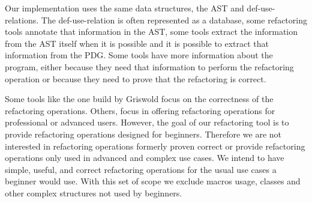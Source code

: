 
Our implementation uses the same data structures, the AST and
def-use-relations. The def-use-relation is often represented as a database,
some refactoring tools annotate that information in the AST, %
some tools extract the information from the AST itself when it is possible and
it is possible to extract that information from the PDG.
Some tools have more information about the program, either because they need that
information to perform the refactoring operation or because they need to prove that
the refactoring is correct.  %

Some tools like the one build by Griswold focus on the correctness of the refactoring
operations.
Others, focus in offering refactoring operations for professional or advanced users.
However, the goal of our refactoring tool is to provide refactoring operations
designed for beginners. %
Therefore we are not interested in refactoring operations formerly proven %
correct or provide refactoring operations only used in advanced and complex use cases. %
We intend to have simple, useful, and correct refactoring operations for the usual use cases a beginner would use.
With this set of scope we exclude macros usage, classes and other complex structures %
not used by beginners.


